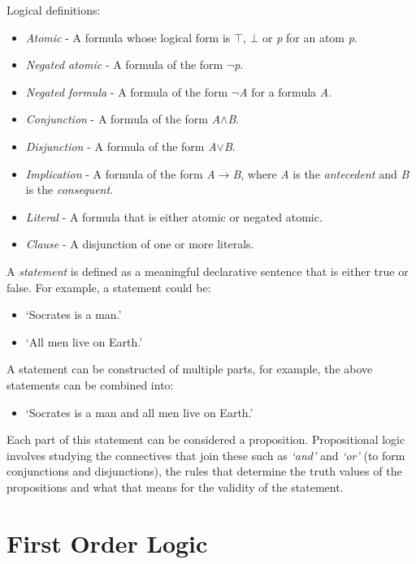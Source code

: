 \documentclass[draft]{report}
\begin{document}
Logical definitions:

\begin{itemize}
\item \emph{Atomic} - A formula whose logical form is $\top$, $\bot$ or \textit{p} for an atom \textit{p}.
\item \emph{Negated atomic} - A formula of the form $\neg$\textit{p}.
\item \emph{Negated formula} - A formula of the form $\neg$\textit{A} for a formula \textit{A}.
\item \emph{Conjunction} - A formula of the form \textit{A}$\land$\textit{B}.
\item \emph{Disjunction} - A formula of the form \textit{A}$\lor$\textit{B}.
\item \emph{Implication} - A formula of the form \textit{A}$\to$\textit{B}, where \textit{A} is the \emph{antecedent} and \textit{B} is the \emph{consequent}.
\item \emph{Literal} - A formula that is either atomic or negated atomic.
\item \emph{Clause} - A disjunction of one or more literals.
\end{itemize}

A \textit{statement} is defined as a meaningful declarative sentence that is either true or false. For example, a statement could be: 

\begin{itemize}
\item `Socrates is a man.'
\item `All men live on Earth.'
\end{itemize}
A statement can be constructed of multiple parts, for example, the above statements can be combined into:

\begin{itemize}
\item `Socrates is a man and all men live on Earth.'
\end{itemize}
Each part of this statement can be considered a proposition. Propositional logic involves studying the connectives that join these such as \textit{`and'} and \textit{`or'} (to form conjunctions and disjunctions), the rules that determine the truth values of the propositions and what that means for the validity of the statement.

\section{First Order Logic}
\end{document}
